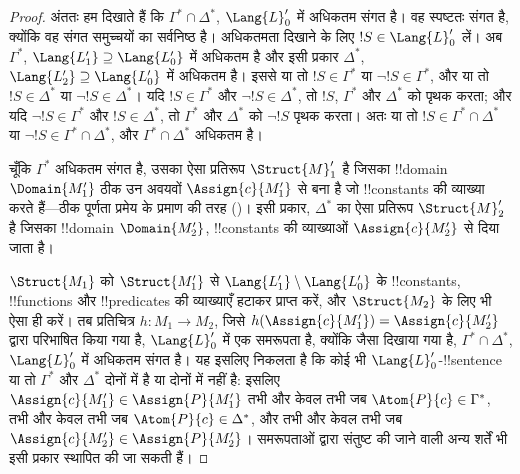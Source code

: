 \documentclass[../../../include/open-logic-section]{subfiles}
\begin{document}
\begin{proof}
अंततः हम दिखाते हैं कि $\Gamma^* \cap \Delta^*$, $\Lang{L}'_0$ में
अधिकतम संगत है। वह स्पष्टतः संगत है, क्योंकि वह संगत समुच्चयों का
सर्वनिष्ठ है। अधिकतमता दिखाने के लिए $!S \in
\Lang{L}'_0$ लें। अब $\Gamma^*$, $\Lang{L'_1}
\supseteq \Lang{L'_0}$ में अधिकतम है और इसी
प्रकार $\Delta^*$, $\Lang{L'_2} \supseteq \Lang{L'_0}$ में अधिकतम है।
इससे या तो $!S \in \Gamma^*$ या $\lnot !S \in \Gamma^*$, और या तो
$!S \in \Delta^*$ या $\lnot !S \in \Delta^*$। यदि $!S \in
\Gamma^*$ और $\lnot !S \in \Delta^*$, तो $!S$, $\Gamma^*$ और
$\Delta^*$ को पृथक करता; और यदि $\lnot !S \in
\Gamma^*$ और $!S \in \Delta^*$, तो $\Gamma^*$ और $\Delta^*$ को
$\lnot !S$ पृथक करता। अतः या तो $!S \in
\Gamma^* \cap \Delta^*$ या $\lnot !S \in \Gamma^* \cap \Delta^*$,
और $\Gamma^* \cap \Delta^*$ अधिकतम है।

चूँकि $\Gamma^*$ अधिकतम संगत है, उसका ऐसा प्रतिरूप $\Struct{M}'_1$ है
जिसका !!{domain} $\Domain{M'_1}$ ठीक उन अवयवों $\Assign{c}{M'_1}$ से
बना है जो !!{constant}s की व्याख्या करते हैं---ठीक पूर्णता प्रमेय के
प्रमाण की तरह ()। इसी प्रकार,
$\Delta^*$ का ऐसा प्रतिरूप $\Struct{M}'_2$ है जिसका !!{domain}
$\Domain{M'_2}$, !!{constant}s की व्याख्याओं $\Assign{c}{M'_2}$ से
दिया जाता है।

$\Struct{M_1}$ को $\Struct{M'_1}$ से $\Lang{L'_1} \setminus \Lang{L'_0}$
के !!{constant}s, !!{function}s और !!{predicate}s की
व्याख्याएँ हटाकर प्राप्त करें, और $\Struct{M_2}$ के लिए भी ऐसा ही करें।
तब प्रतिचित्र $h \colon M_1 \to M_2$, जिसे
$h(\Assign{c}{M'_1}) = \Assign{c}{M'_2}$ द्वारा परिभाषित किया गया है,
$\Lang{L}'_0$ में एक समरूपता है, क्योंकि जैसा
दिखाया गया है, $\Gamma^* \cap \Delta^*$, $\Lang{L}'_0$ में अधिकतम संगत
है। यह इसलिए निकलता है कि कोई भी $\Lang{L}'_0$-!!{sentence} या तो
$\Gamma^*$ और $\Delta^*$ दोनों में है या दोनों में नहीं है: इसलिए
$\Assign{c}{M'_1} \in
\Assign{P}{M'_1}$ तभी और केवल तभी जब
$\Atom{P}{c} \in \Gamma^*$, तभी और केवल तभी जब
$\Atom{P}{c} \in \Delta^*$, और तभी और केवल तभी जब
$\Assign{c}{M'_2} \in
\Assign{P}{M'_2}$। समरूपताओं द्वारा संतुष्ट की
जाने वाली अन्य शर्तें भी इसी प्रकार स्थापित की जा सकती हैं।


\end{proof}
\end{document}
